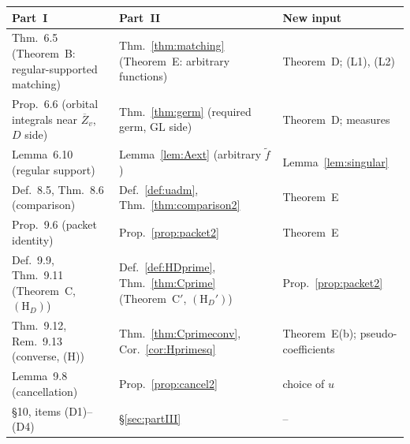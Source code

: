\documentclass[12pt]{article}
\newcommand{\ov}[1]{\overline{#1}}
\newcommand{\GL}{\mathrm{GL}}
\newcommand{\Zb}{\ov{Z}}
\theoremstyle{plain}
\theoremstyle{definition}
\begin{document}
\begin{center}
\begin{tabular}{>{\raggedright\arraybackslash}p{}>{\raggedright\arraybackslash}p{}>{\raggedright\arraybackslash}p{}}
\toprule
Part~I & Part~II & New input\\
\midrule
Thm.~6.5 (Theorem~B: regular-supported matching) & Thm.~\ref{thm:matching} (Theorem~E: arbitrary functions) & Theorem~D; (L1), (L2)\\
Prop.~6.6 (orbital integrals near $\Zb_v$, $D$ side) & Thm.~\ref{thm:germ} (required germ, $\GL$ side) & Theorem~D; measures\\
Lemma~6.10 (regular support) & Lemma~\ref{lem:Aext} (arbitrary $\tilde f$) & Lemma~\ref{lem:singular}\\
Def.~8.5, Thm.~8.6 (comparison) & Def.~\ref{def:uadm}, Thm.~\ref{thm:comparison2} & Theorem~E\\
Prop.~9.6 (packet identity) & Prop.~\ref{prop:packet2} & Theorem~E\\
Def.~9.9, Thm.~9.11 (Theorem~C, $(\mathrm H_D)$) & Def.~\ref{def:HDprime}, Thm.~\ref{thm:Cprime} (Theorem~C$'$, $(\mathrm H_D')$) & Prop.~\ref{prop:packet2}\\
Thm.~9.12, Rem.~9.13 (converse, (H)) & Thm.~\ref{thm:Cprimeconv}, Cor.~\ref{cor:Hprimesq} & Theorem~E(b); pseudo-coefficients\\
Lemma~9.8 (cancellation) & Prop.~\ref{prop:cancel2} & choice of $u$\\
\S10, items (D1)--(D4) & \S\ref{sec:partIII} & --\\
\bottomrule
\end{tabular}
\end{center}
\end{document}
